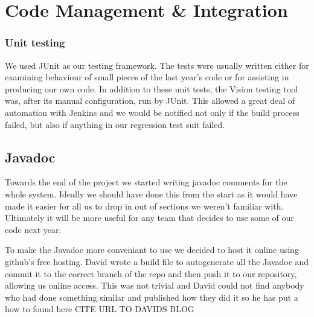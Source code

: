 \section{Code Management \& Integration}

\subsubsection{Unit testing}
We used JUnit as our testing framework. The tests were usually written either for examining behaviour of small pieces of the last year's code or for assisting in producing our own code. In addition to these unit tests, the Vision testing tool was, after its manual configuration, run by JUnit. This allowed a great deal of automation with Jenkins and we would be notified not only if the build process failed, but also if anything in our regression test suit failed.

\subsection{Javadoc}
Towards the end of the project we started writing javadoc comments for the whole system.  Ideally we should have done this from the start as it would have made it easier for all us to drop in out of sections we weren't familiar with.  Ultimately it will be more useful for any team that decides to use some of our code next year. 

To make the Javadoc more conveniant to use we decided to host it online using github's free hosting.  David wrote a build file to autogenerate all the Javadoc and commit it to the correct branch of the repo and then push it to our repository, allowing us online access.  This was not trivial and David could not find anybody who had done something similar and published how they did it so he has put a how to found here CITE URL TO DAVIDS BLOG
